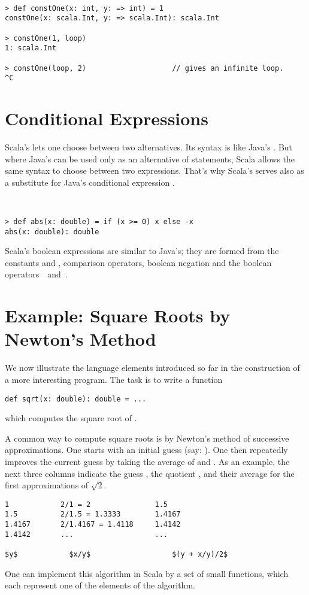\example\ 
 
\begin{lstlisting}
> def constOne(x: int, y: => int) = 1
constOne(x: scala.Int, y: => scala.Int): scala.Int

> constOne(1, loop)
1: scala.Int

> constOne(loop, 2)                    // gives an infinite loop.
^C
\end{lstlisting}

\section{Conditional Expressions}

Scala's  lets one choose between two alternatives.  Its
syntax is like Java's . But where Java's 
can be used only as an alternative of statements, Scala allows the
same syntax to choose between two expressions. That's why Scala's
 serves also as a substitute for Java's conditional
expression .

\example\ 

\begin{lstlisting}
> def abs(x: double) = if (x >= 0) x else -x
abs(x: double): double
\end{lstlisting}
Scala's boolean expressions are similar to Java's; they are formed
from the constants
 and
, comparison operators, boolean negation \code{!} and the
boolean operators $\,$\code{&&}$\,$ and $\,$\code{||}.

\section{\label{sec:sqrt}Example: Square Roots by Newton's Method}

We now illustrate the language elements introduced so far in the
construction of a more interesting program. The task is to write a
function
\begin{lstlisting}
def sqrt(x: double): double = ... 
\end{lstlisting}
which computes the square root of .

A common way to compute square roots is by Newton's method of
successive approximations. One starts with an initial guess 
(say: ). One then repeatedly improves the current guess
 by taking the average of  and .  As an
example, the next three columns indicate the guess , the
quotient , and their average for the first approximations of
$\sqrt 2$.
\begin{lstlisting}
1            2/1 = 2               1.5
1.5          2/1.5 = 1.3333        1.4167
1.4167       2/1.4167 = 1.4118     1.4142
1.4142       ...                   ...

$y$            $x/y$                   $(y + x/y)/2$
\end{lstlisting}
One can implement this algorithm in Scala by a set of small functions,
which each represent one of the elements of the algorithm.  

